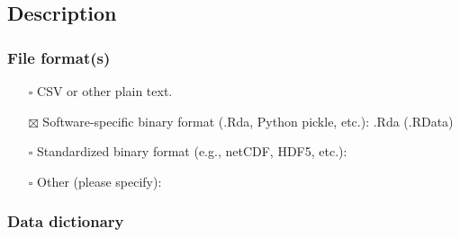 \documentclass[
]{article}
\providecommand{\tightlist}{%
  \setlength{\itemsep}{0pt}\setlength{\parskip}{0pt}}
\begin{document}
\subsection{Description}\label{description}

\subsubsection{File format(s)}\label{file-formats}

\begin{itemize}
\tightlist
\item[$\square$]
  CSV or other plain text.
\item[$\boxtimes$]
  Software-specific binary format (.Rda, Python pickle, etc.): .Rda
  (.RData)
\item[$\square$]
  Standardized binary format (e.g., netCDF, HDF5, etc.):
\item[$\square$]
  Other (please specify):
\end{itemize}

\subsubsection{Data dictionary}\label{data-dictionary}
\end{document}
